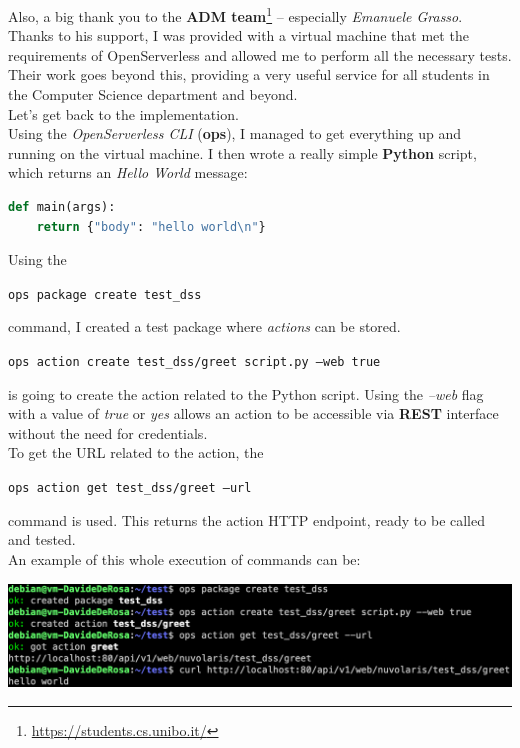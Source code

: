 Also, a big thank you to the \textbf{ADM team}\footnote{\url{https://students.cs.unibo.it/}} -- especially \textit{Emanuele Grasso}. Thanks to his support, I was provided with a virtual machine that met the requirements of OpenServerless and allowed me to perform all the necessary tests. Their work goes beyond this, providing a very useful service for all students in the Computer Science department and beyond.\vspace{14pt}\\
Let's get back to the implementation.\vspace{14pt}\\
Using the \textit{OpenServerless CLI} (\textbf{ops}), I managed to get everything up and running on the virtual machine. I then wrote a really simple \textbf{Python} script, which returns an \textit{Hello World} message:
\begin{lstlisting}[language=python]
def main(args):
    return {"body": "hello world\n"}
\end{lstlisting}
\vspace{15pt}
Using the \vspace{-5pt}
\begin{center}
    \colorbox{codegray}{\texttt{ops package create test\_dss}}
\end{center} 
command, I created a test package where \textit{actions} can be stored.\\
\begin{center}
    \colorbox{codegray}{\texttt{ops action create test\_dss/greet script.py --web true}}
\end{center} 
is going to create the action related to the Python script. Using the \textit{--web} flag with a value of \textit{true} or \textit{yes} allows an action to be accessible via \textbf{REST} interface without the need for credentials.\vspace{14pt}\\
To get the URL related to the action, the
\begin{center}
    \colorbox{codegray}{\texttt{ops action get test\_dss/greet --url}}
\end{center} 
command is used. This returns the action HTTP endpoint, ready to be called and tested.\vspace{150pt}\\
An example of this whole execution of commands can be:
\begin{center}
    \includegraphics[width=1\textwidth]{img/demo.png}
\end{center}
